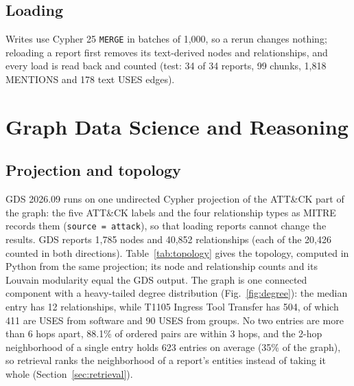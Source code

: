 \documentclass[conference,letterpaper]{IEEEtran}
\newcommand{\code}[1]{\texttt{#1}}
\begin{document}
\subsection{Loading}
Writes use Cypher 25 \code{MERGE} in batches of 1,000, so a rerun changes nothing; reloading a report first removes its text-derived nodes and relationships, and every load is read back and counted (test: 34 of 34 reports, 99 chunks, 1,818 MENTIONS and 178 text USES edges).

\section{Graph Data Science and Reasoning}\label{sec:gds}
\subsection{Projection and topology}
GDS 2026.09 runs on one undirected Cypher projection of the ATT\&CK part of the graph: the five ATT\&CK labels and the four relationship types as MITRE records them (\code{source = attack}), so that loading reports cannot change the results. GDS reports 1,785 nodes and 40,852 relationships (each of the 20,426 counted in both directions). Table~\ref{tab:topology} gives the topology, computed in Python from the same projection; its node and relationship counts and its Louvain modularity equal the GDS output. The graph is one connected component with a heavy-tailed degree distribution (Fig.~\ref{fig:degree}): the median entry has 12 relationships, while T1105 Ingress Tool Transfer has 504, of which 411 are USES from software and 90 USES from groups. No two entries are more than 6 hops apart, 88.1\% of ordered pairs are within 3 hops, and the 2-hop neighborhood of a single entry holds 623 entries on average (35\% of the graph), so retrieval ranks the neighborhood of a report's entities instead of taking it whole (Section~\ref{sec:retrieval}).
\end{document}
